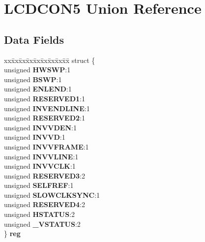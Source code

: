 \hypertarget{unionLCDCON5}{}\section{L\+C\+D\+C\+O\+N5 Union Reference}
\label{unionLCDCON5}
\subsection*{Data Fields}
\begin{DoxyCompactItemize}
\item 
\mbox{\label{unionLCDCON5_a94a2554b04594be2392fe3888df6c9f1}} 
\begin{tabbing}
xx\=xx\=xx\=xx\=xx\=xx\=xx\=xx\=xx\=\kill
struct \{\\
\>unsigned {\bfseries HWSWP}:1\\
\>unsigned {\bfseries BSWP}:1\\
\>unsigned {\bfseries ENLEND}:1\\
\>unsigned {\bfseries RESERVED1}:1\\
\>unsigned {\bfseries INVENDLINE}:1\\
\>unsigned {\bfseries RESERVED2}:1\\
\>unsigned {\bfseries INVVDEN}:1\\
\>unsigned {\bfseries INVVD}:1\\
\>unsigned {\bfseries INVVFRAME}:1\\
\>unsigned {\bfseries INVVLINE}:1\\
\>unsigned {\bfseries INVVCLK}:1\\
\>unsigned {\bfseries RESERVED3}:2\\
\>unsigned {\bfseries SELFREF}:1\\
\>unsigned {\bfseries SLOWCLKSYNC}:1\\
\>unsigned {\bfseries RESERVED4}:2\\
\>unsigned {\bfseries HSTATUS}:2\\
\>unsigned {\bfseries \_VSTATUS}:2\\
\} {\bfseries reg}\\


\end{tabbing}
\end{DoxyCompactItemize}
